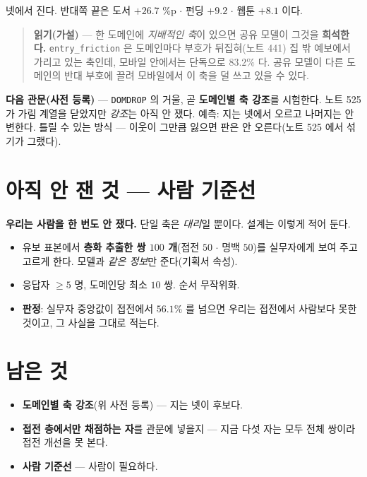 \documentclass[11pt]{article}
\begin{document}
넷에서 진다. 반대쪽 끝은 도서 $+26.7$ \%p $\cdot$ 펀딩 $+9.2$ $\cdot$ 웹툰
$+8.1$ 이다.

\begin{quote}
\textbf{읽기(가설)} --- 한 도메인에 \emph{지배적인 축}이 있으면 공유 모델이
그것을 \textbf{희석한다.} \texttt{entry\_friction} 은 도메인마다 부호가
뒤집혀(노트 441) 집 밖 예보에서 가리고 있는 축인데, 모바일 안에서는 단독으로
$83.2\%$ 다. 공유 모델이 다른 도메인의 반대 부호에 끌려 모바일에서 이 축을
덜 쓰고 있을 수 있다.
\end{quote}

\textbf{다음 관문(사전 등록)} --- \texttt{DOMDROP} 의 거울, 곧 \textbf{도메인별
축 강조}를 시험한다. 노트 525 가 가림 계열을 닫았지만 \emph{강조}는 아직 안
쟀다. 예측: 지는 넷에서 오르고 나머지는 안 변한다. 틀릴 수 있는 방식 ---
이웃이 그만큼 잃으면 판은 안 오른다(노트 525 에서 섞기가 그랬다).

\section*{아직 안 잰 것 --- 사람 기준선}

\textbf{우리는 사람을 한 번도 안 쟀다.} 단일 축은 \emph{대리}일 뿐이다.
설계는 이렇게 적어 둔다.

\begin{itemize}
\item 유보 표본에서 \textbf{층화 추출한 쌍 $100$ 개}(접전 $50$ $\cdot$ 명백 $50$)를
실무자에게 보여 주고 고르게 한다. 모델과 \emph{같은 정보}만 준다(기획서 속성).
\item 응답자 $\ge 5$ 명, 도메인당 최소 $10$ 쌍. 순서 무작위화.
\item \textbf{판정}: 실무자 중앙값이 접전에서 $56.1\%$ 를 넘으면 우리는 접전에서
사람보다 못한 것이고, 그 사실을 그대로 적는다.
\end{itemize}

\section*{남은 것}

\begin{itemize}
\item \textbf{도메인별 축 강조}(위 사전 등록) --- 지는 넷이 후보다.
\item \textbf{접전 층에서만 채점하는 자}를 관문에 넣을지 --- 지금 다섯 자는
모두 전체 쌍이라 접전 개선을 못 본다.
\item \textbf{사람 기준선} --- 사람이 필요하다.
\end{itemize}
\end{document}
